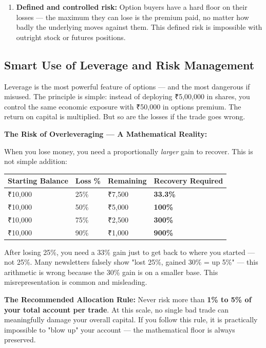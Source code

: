 \documentclass[12pt,openany]{book}
\begin{document}
\begin{enumerate}[leftmargin=*]
    \item \textbf{Defined and controlled risk:} Option buyers have a hard floor on their losses — the maximum they can lose is the premium paid, no matter how badly the underlying moves against them. This defined risk is impossible with outright stock or futures positions.
\end{enumerate}


\subsection{Smart Use of Leverage and Risk Management}

Leverage is the most powerful feature of options — and the most dangerous if misused. The principle is simple: instead of deploying ₹5,00,000 in shares, you control the same economic exposure with ₹50,000 in options premium. The return on capital is multiplied. But so are the losses if the trade goes wrong.

\textbf{The Risk of Overleveraging — A Mathematical Reality:}

When you lose money, you need a proportionally \emph{larger} gain to recover. This is not simple addition:

\begin{center}
\scriptsize
\setlength{\tabcolsep}{3pt}
\begin{tabular}{|L{3.30cm}|L{3.30cm}|L{3.30cm}|L{3.30cm}|}
\hline
Starting Balance & Loss \% & Remaining & Recovery Required \\
\hline
₹10,000 & 25\% & ₹7,500 & \textbf{33.3\%} \\
\hline
₹10,000 & 50\% & ₹5,000 & \textbf{100\%} \\
\hline
₹10,000 & 75\% & ₹2,500 & \textbf{300\%} \\
\hline
₹10,000 & 90\% & ₹1,000 & \textbf{900\%} \\
\hline
\end{tabular}
\end{center}

After losing 25\%, you need a 33\% gain just to get back to where you started — not 25\%. Many newsletters falsely show "lost 25\%, gained 30\% = up 5\%" — this arithmetic is wrong because the 30\% gain is on a smaller base. This misrepresentation is common and misleading.

\textbf{The Recommended Allocation Rule:} Never risk more than \textbf{1\% to 5\% of your total account per trade}. At this scale, no single bad trade can meaningfully damage your overall capital. If you follow this rule, it is practically impossible to "blow up" your account — the mathematical floor is always preserved.
\end{document}
